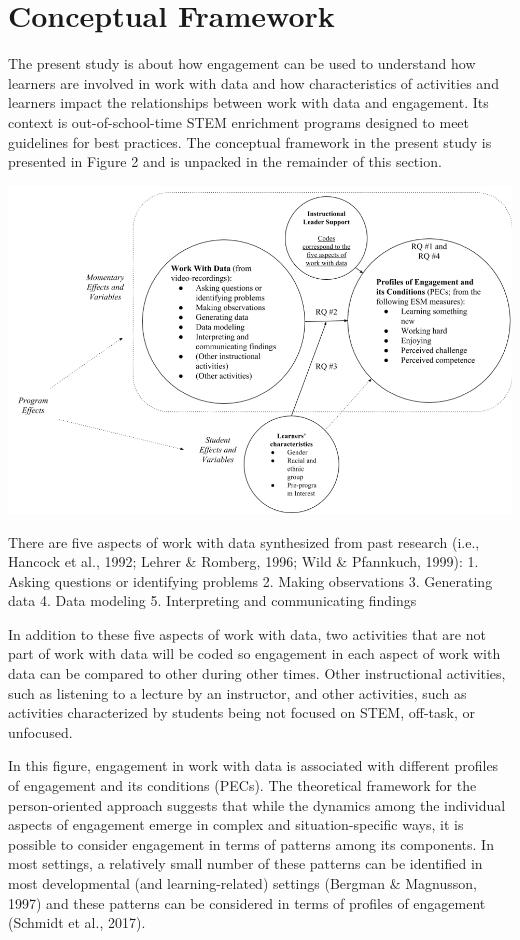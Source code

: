 \documentclass[]{book}
\theoremstyle{definition}
\theoremstyle{definition}
\theoremstyle{definition}
\theoremstyle{remark}
\begin{document}
\section{Conceptual Framework}\label{conceptual-framework}

The present study is about how engagement can be used to understand how
learners are involved in work with data and how characteristics of
activities and learners impact the relationships between work with data
and engagement. Its context is out-of-school-time STEM enrichment
programs designed to meet guidelines for best practices. The conceptual
framework in the present study is presented in Figure 2 and is unpacked
in the remainder of this section.

\begin{center}\includegraphics[width=0.8\linewidth]{images/figure2} \end{center}

There are five aspects of work with data synthesized from past research
(i.e., Hancock et al., 1992; Lehrer \& Romberg, 1996; Wild \& Pfannkuch,
1999): 1. Asking questions or identifying problems 2. Making
observations 3. Generating data 4. Data modeling 5. Interpreting and
communicating findings

In addition to these five aspects of work with data, two activities that
are not part of work with data will be coded so engagement in each
aspect of work with data can be compared to other during other times.
Other instructional activities, such as listening to a lecture by an
instructor, and other activities, such as activities characterized by
students being not focused on STEM, off-task, or unfocused.

In this figure, engagement in work with data is associated with
different profiles of engagement and its conditions (PECs). The
theoretical framework for the person-oriented approach suggests that
while the dynamics among the individual aspects of engagement emerge in
complex and situation-specific ways, it is possible to consider
engagement in terms of patterns among its components. In most settings,
a relatively small number of these patterns can be identified in most
developmental (and learning-related) settings (Bergman \& Magnusson,
1997) and these patterns can be considered in terms of profiles of
engagement (Schmidt et al., 2017).
\end{document}
